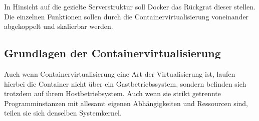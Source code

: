 \documentclass[12pt,a4paper]{scrartcl}
\begin{document}
In Hinsicht auf die gezielte Serverstruktur soll Docker das Rückgrat dieser stellen. Die einzelnen Funktionen sollen durch die Containervirtualisierung voneinander abgekoppelt und skalierbar werden.

\subsection{Grundlagen der Containervirtualisierung}

Auch wenn Containervirtualisierung eine Art der Virtualisierung ist, laufen hierbei die Container nicht über ein Gastbetriebssystem, sondern befinden sich trotzdem auf ihrem Hostbetriebsystem. Auch wenn sie strikt getrennte Programminstanzen mit allesamt eigenen Abhängigkeiten und Ressourcen sind, teilen sie sich denselben Systemkernel. 
\end{document}
